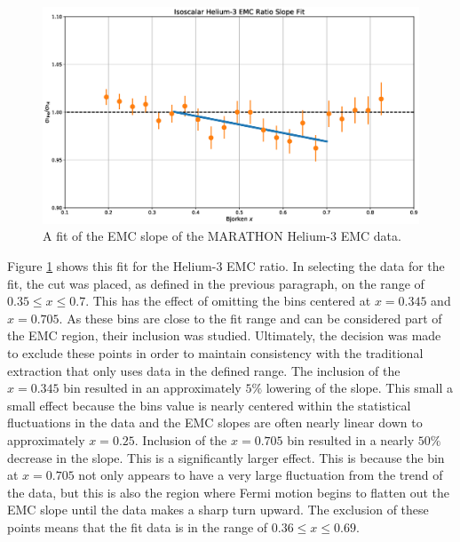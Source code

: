 \begin{figure}[p]
	\includegraphics[width=\textwidth]{./results/fig/slope_fit.eps}
	\caption{A fit of the EMC slope of the MARATHON Helium-3 EMC data.}
	\label{fig:slope_fit}
\end{figure}

Figure \ref{fig:slope_fit} shows this fit for the Helium-3 EMC ratio. In selecting the data for the fit, the cut was placed, as defined in the previous paragraph, on the range of $0.35 \leq x \leq 0.7$. This has the effect of omitting the bins centered at $x=0.345$ and $x=0.705$. As these bins are close to the fit range and can be considered part of the EMC region, their inclusion was studied. Ultimately, the decision was made to exclude these points in order to maintain consistency with the traditional extraction that only uses data in the defined range. The inclusion of the $x=0.345$ bin resulted in an approximately $5\%$ lowering of the slope. This small a small effect because the bins value is nearly centered within the statistical fluctuations in the data and the EMC slopes are often nearly linear down to approximately $x=0.25$. Inclusion of the $x=0.705$ bin resulted in a nearly $50\%$ decrease in the slope. This is a significantly larger effect. This is because the bin at $x=0.705$ not only appears to have a very large fluctuation from the trend of the data, but this is also the region where Fermi motion begins to flatten out the EMC slope until the data makes a sharp turn upward. The exclusion of these points means that the fit data is in the range of $0.36 \leq x \leq 0.69$.

